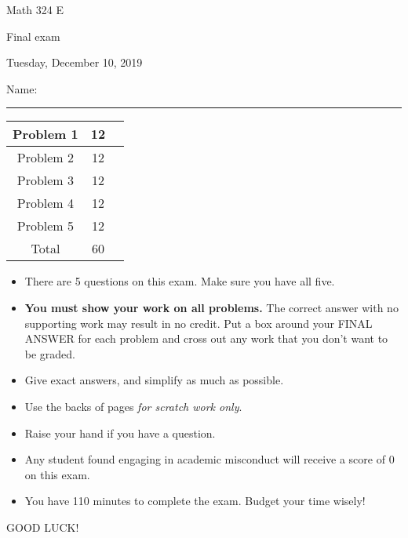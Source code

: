 \documentclass[12 pt]{report}
\begin{document}
\noindent \vfill \noindent \large

\centerline{Math 324 E}

\centerline{Final exam}

\centerline{Tuesday, December 10, 2019}

\normalsize

\vfill
\medskip
Name: \rule{10cm}{1pt}

\bigskip

\vfill
\begin{center}
{\large
\begin{tabular}{||c|c|r||}
\hline Problem 1 & 12 & \hspace{10mm} \hfill \\
\hline Problem 2 & 12  & \hspace{10mm} \hfill \\
\hline Problem 3 & 12 & \hspace{10mm} \hfill \\
\hline Problem 4 & 12  & \hspace{10mm} \hfill \\
\hline Problem 5 & 12  & \hspace{10mm} \hfill \\
\hline Total & 60 & \hspace{10mm} \hfill \\
\hline
\end{tabular}
}
\end{center}
\vfill
\begin{itemize}
\item There are 5 questions on this exam. Make sure you have all five.
\item \textbf{You must show your work on all problems.}  The correct answer
with no supporting work may result in no credit. Put a box
around your FINAL ANSWER for each problem and cross out any work
that you don't want to be graded.
\item Give exact answers, and simplify as much as possible. 
\item Use the backs of pages \textit{for scratch work only}.
\item Raise your hand if you have a question.
\item Any student found engaging in academic misconduct will receive
a score of 0 on this exam.
\item You have 110 minutes to complete the exam.  Budget your time wisely! \\
\end{itemize}
\vfill
\begin{center}GOOD LUCK!\end{center}
\end{document}
